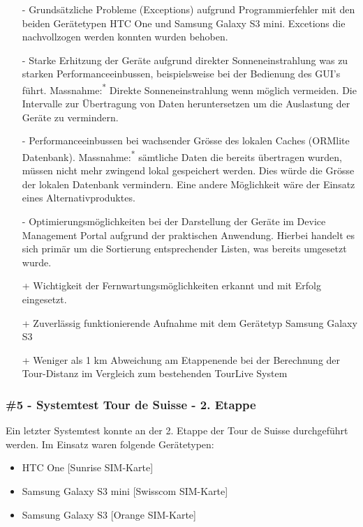 \begin{itemize} [noitemsep,topsep=0pt]
\item[-] Grundsätzliche Probleme (Exceptions) aufgrund Programmierfehler mit den beiden Gerätetypen HTC One und Samsung Galaxy S3 mini. Excetions die nachvollzogen werden konnten wurden behoben.
\item[-] Starke Erhitzung der Geräte aufgrund direkter Sonneneinstrahlung was zu starken Performanceeinbussen, beispielsweise bei der Bedienung des GUI's führt. Massnahme:\textsuperscript{*} Direkte Sonneneinstrahlung wenn möglich vermeiden. Die Intervalle zur Übertragung von Daten heruntersetzen um die Auslastung der Geräte zu vermindern.
\item[-] Performanceeinbussen bei wachsender Grösse des lokalen Caches (ORMlite Datenbank). Massnahme:\textsuperscript{*} sämtliche Daten die bereits übertragen wurden, müssen nicht mehr zwingend lokal gespeichert werden. Dies würde die Grösse der lokalen Datenbank vermindern. Eine andere Möglichkeit wäre der Einsatz eines Alternativproduktes.
\item[-] Optimierungsmöglichkeiten bei der Darstellung der Geräte im Device Management Portal aufgrund der praktischen Anwendung. Hierbei handelt es sich primär um die Sortierung entsprechender Listen, was bereits umgesetzt wurde.
\item[+] Wichtigkeit der Fernwartungsmöglichkeiten erkannt und mit Erfolg eingesetzt.
\item[+] Zuverlässig funktionierende Aufnahme mit dem Gerätetyp Samsung Galaxy S3
\item[+] Weniger als 1 km Abweichung am Etappenende bei der Berechnung der Tour-Distanz im Vergleich zum bestehenden TourLive System
\end{itemize}

\subsubsection{\#5 - Systemtest Tour de Suisse - 2. Etappe}
Ein letzter Systemtest konnte an der 2. Etappe der Tour de Suisse durchgeführt werden. Im Einsatz waren folgende Gerätetypen:
\begin{itemize} [noitemsep,topsep=0pt]
	\item HTC One [Sunrise SIM-Karte]
	\item Samsung Galaxy S3 mini [Swisscom SIM-Karte]
	\item Samsung Galaxy S3 [Orange SIM-Karte]
\end{itemize}
